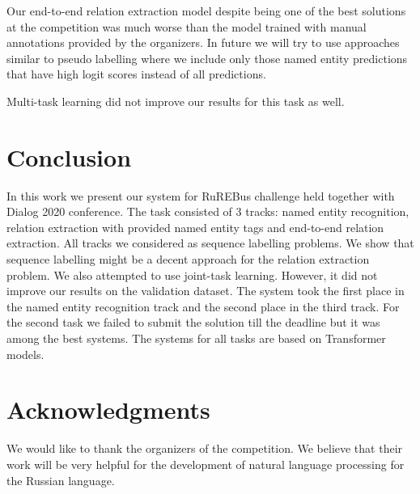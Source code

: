 \documentclass{dialogue}
\begin{document}
	Our end-to-end relation extraction model despite being one of the best solutions at the competition was much worse than the model trained with manual annotations provided by the organizers. In future we will try to use approaches similar to pseudo labelling where we include only those named entity predictions that have high logit scores instead of all predictions.
	
	Multi-task learning did not improve our results for this task as well. 
	\section{Conclusion}
	In this work we present our system for RuREBus challenge held together with Dialog 2020 conference. The task consisted of 3 tracks: named entity recognition, relation extraction with provided named entity tags and end-to-end relation extraction. All tracks we considered as sequence labelling problems. We show that sequence labelling might be a decent approach for the relation extraction problem. We also attempted to use joint-task learning. However, it did not improve our results on the validation dataset. The system took the first place in the named entity recognition track and the second place in the third track. For the second task we failed to submit the solution till the deadline but it was among the best systems. The systems for all tasks are based on Transformer models.
	
	\section{Acknowledgments}
	We would like to thank the organizers of the competition. We believe that their work will be very helpful for the development of natural language processing for the Russian language.
	
	
	
\end{document}
